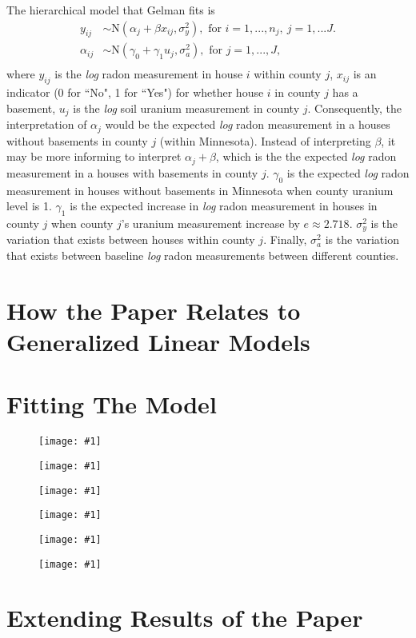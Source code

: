 \documentclass{article}
\def\beginmyfig{\begin{figure}[htbp]\begin{center}}
\def\endmyfig{\end{center}\end{figure}}
\def\myfig#1{\beginmyfig\texttt{[image: \#1]}\endmyfig}
\begin{document}
\noindent
The hierarchical model that Gelman fits is
\begin{align*}
  y_{ij}      &\sim \text{N}(\alpha_j + \beta x_{ij},\sigma_y^2),
               \text{ for }i=1,...,n_j,~j=1,...J.\\
  \alpha_{ij} &\sim \text{N}(\gamma_0 + \gamma_1 u_j,\sigma_a^2),
               \text{ for }j=1,...,J,\\
\end{align*}
where $y_{ij}$ is the \textit{log} radon measurement in house $i$ within county
$j$, $x_{ij}$ is an indicator (0 for ``No", 1 for ``Yes") for whether house $i$
in county $j$ has a basement, $u_j$ is the \textit{log} soil uranium
measurement in county $j$. Consequently, the interpretation of $\alpha_j$ would
be the expected \textit{log} radon measurement in a houses without basements in
county $j$ (within Minnesota). Instead of interpreting $\beta$, it may be more
informing to interpret $\alpha_j+\beta$, which is the the expected \textit{log}
radon measurement in a houses with basements in county $j$. $\gamma_0$ is the
expected \textit{log} radon measurement in houses without basements in
Minnesota when county uranium level is 1. $\gamma_1$ is the expected increase
in \textit{log} radon measurement in houses in county $j$ when county $j$'s
uranium measurement increase by $e\approx 2.718$. $\sigma_y^2$ is the variation
that exists between houses within county $j$. Finally, $\sigma_a^2$ is the
variation that exists between baseline \textit{log} radon measurements between
different counties.\\



\section{How the Paper Relates to Generalized Linear Models}

\section{Fitting The Model}
\myfig{images/apost.pdf}
\myfig{images/bpost.pdf}
\myfig{images/gpost.pdf}
\myfig{images/sy2post.pdf}
\myfig{images/sa2post.pdf}
\myfig{images/au.pdf}

\section{Extending Results of the Paper}
\end{document}
